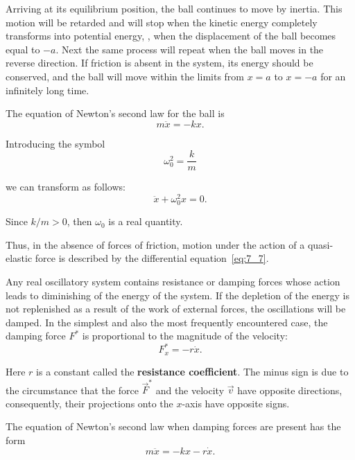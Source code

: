 Arriving at its equilibrium position, the ball continues to move by inertia. This motion will be retarded and will stop when the kinetic energy completely transforms into potential energy, \ie, when the displacement of the ball becomes equal to $-a$. Next the same process will repeat when the ball moves in the reverse direction. If friction is absent in the system, its energy should be conserved, and the ball will move within the limits from $x=a$ to $x=-a$ for an infinitely long time.

The equation of Newton's second law for the ball is
\begin{equation}\label{eq:7_5}
	m\ddot{x} = -kx.
\end{equation}

\noindent
Introducing the symbol
\begin{equation}\label{eq:7_6}
	\omega_0^2 = \frac{k}{m}
\end{equation}

\noindent
we can transform  as follows:
\begin{equation}\label{eq:7_7}
	\ddot{x} + \omega_0^2 x = 0.
\end{equation}

\noindent
Since $k/m>0$, then $\omega_0$ is a real quantity.

Thus, in the absence of forces of friction, motion under the action of a quasi-elastic force is described by the differential equation~\eqref{eq:7_7}.

Any real oscillatory system contains resistance or damping forces whose action leads to diminishing of the energy of the system. If the depletion of the energy is not replenished as a result of the work of external forces, the oscillations will be damped. In the simplest and also the most frequently encountered case, the damping force $F^*$ is proportional to the magnitude of the velocity:
\begin{equation}\label{eq:7_8}
	F_x^* = -r\dot{x}.
\end{equation}

\noindent
Here $r$ is a constant called the \textbf{resistance coefficient}. The minus sign is due to the circumstance that the force $\vec{F}^*$ and the velocity $\vec{v}$ have opposite directions, consequently, their projections onto the $x$-axis have opposite signs.

The equation of Newton's second law when damping forces are present has the form
\begin{equation}\label{eq:7_9}
	m\ddot{x} = -kx - r\dot{x}.
\end{equation}

